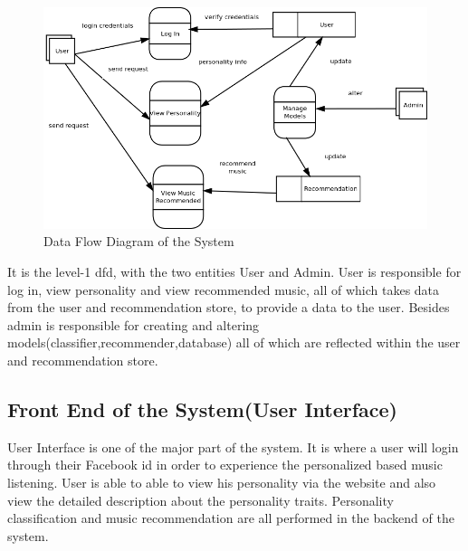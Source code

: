 \begin{figure}[!ht]
\centering
\includegraphics[width = 16 cm]{fig/dfd.png}
\caption{Data Flow Diagram of the System}
\label{fig:dfd}
\end{figure}

It is the level-1 dfd, with the two entities User and Admin. User is responsible for log in, view personality and view recommended music, all of which takes data from the user and recommendation store, to provide a data to the user. Besides admin is responsible for creating and altering models(classifier,recommender,database) all of which are reflected within the user and recommendation store.

\subsection{Front End of the System(User Interface)}
User Interface is one of the major part of the system. It is where a user will login through their Facebook id in order to experience the personalized based music listening. User is able to able to view his personality via the website and also view the detailed description about the personality traits. Personality classification and music recommendation are all performed in the backend of the system.


